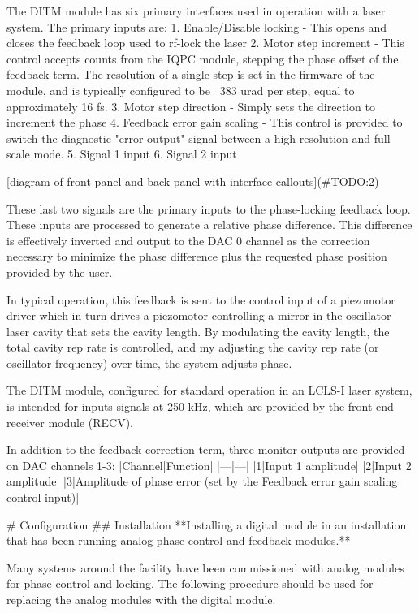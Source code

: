 \documentclass{article}
\begin{document}
The DITM module has six primary interfaces used in operation with a laser system. The primary inputs are:
1. Enable/Disable locking
- This opens and closes the feedback loop used to rf-lock the laser
2. Motor step increment
- This control accepts counts from the IQPC module, stepping the phase offset of the feedback term. The resolution of a single step is set in the firmware of the module, and is typically configured to be ~383 urad per step, equal to approximately 16 fs.
3. Motor step direction
- Simply sets the direction to increment the phase
4. Feedback error gain scaling
- This control is provided to switch the diagnostic "error output" signal between a high resolution and full scale mode.
5. Signal 1 input
6. Signal 2 input

[diagram of front panel and back panel with interface callouts](#TODO:2)

These last two signals are the primary inputs to the phase-locking feedback loop. These inputs are processed to generate a relative phase difference. This difference is effectively inverted and output to the DAC 0 channel as the correction necessary to minimize the phase difference plus the requested phase position provided by the user.

In typical operation, this feedback is sent to the control input of a piezomotor driver which in turn drives a piezomotor controlling a mirror in the oscillator laser cavity that sets the cavity length. By modulating the cavity length, the total cavity rep rate is controlled, and my adjusting the cavity rep rate (or oscillator frequency) over time, the system adjusts phase.

The DITM module, configured for standard operation in an LCLS-I laser system, is intended for inputs signals at 250 kHz, which are provided by the front end receiver module (RECV).

In addition to the feedback correction term, three monitor outputs are provided on DAC channels 1-3:
|Channel|Function|
|---|---|
|1|Input 1 amplitude|
|2|Input 2 amplitude|
|3|Amplitude of phase error (set by the Feedback error gain scaling control input)|

# Configuration
## Installation
**Installing a digital module in an installation that has been running analog phase control and feedback modules.**

Many systems around the facility have been commissioned with analog modules for phase control and locking. The following procedure should be used for replacing the analog modules with the digital module.
\end{document}
